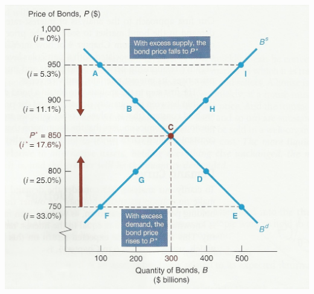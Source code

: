 \documentclass[12pt]{examnotes}
\begin{document}
\begin{center}
  \includegraphics[scale=0.4]{./imgs/supplydemand.jpg}
\end{center}
\end{document}

